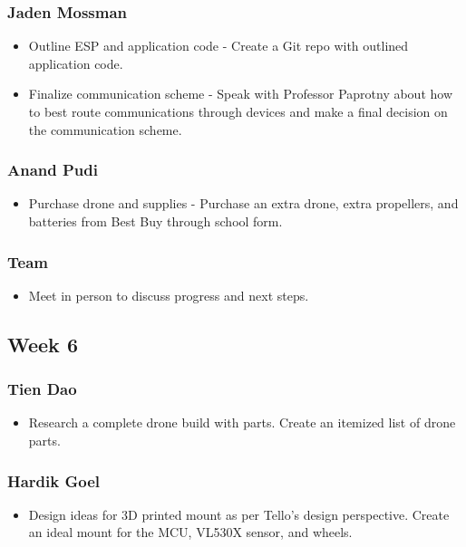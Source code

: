 \documentclass[12pt]{article}
\begin{document}
            \subsubsection*{Jaden Mossman}
                \begin{itemize}
                    \item Outline ESP and application code - Create a Git repo with outlined application code.
                    \item Finalize communication scheme - Speak with Professor Paprotny about how to best route communications through devices and make a final decision on the communication scheme.
                \end{itemize}
            \subsubsection*{Anand Pudi}
                \begin{itemize}
                    \item Purchase drone and supplies - Purchase an extra drone, extra propellers, and batteries from Best Buy through school form.
                \end{itemize}
            \subsubsection*{Team}
                \begin{itemize}
                    \item Meet in person to discuss progress and next steps.
                \end{itemize}
        
        \subsection*{Week 6}
            \subsubsection*{Tien Dao}
                \begin{itemize}
                    \item Research a complete drone build with parts. Create an itemized list of drone parts.
                \end{itemize}
            \subsubsection*{Hardik Goel}
                \begin{itemize}
                    \item Design ideas for 3D printed mount as per Tello's design perspective. Create an ideal mount for the MCU, VL530X sensor, and wheels.
                \end{itemize}
\end{document}
